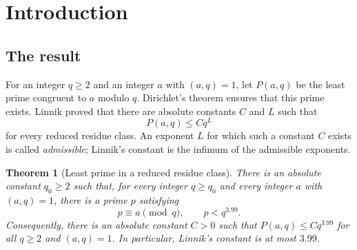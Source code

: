 \documentclass[11pt]{amsart}
\numberwithin{equation}{section}
\theoremstyle{plain}
\newtheorem{theorem}{Theorem}[section]
\theoremstyle{definition}
\theoremstyle{remark}
\newcommand{\1}{\mathbf{1}}
\begin{document}
\begin{center}
\end{center}

\clearpage
\setcounter{tocdepth}{1}
\begingroup
\small
\tableofcontents
\endgroup

\section{Introduction}\label{sec:intro}

\subsection{The result}
For an integer $q\ge2$ and an integer $a$ with $(a,q)=1$, let $P(a,q)$ be the least prime
congruent to $a$ modulo $q$. Dirichlet's theorem \cite{Dirichlet1889beweis} ensures that this
prime exists. Linnik \cite{Linnik1944least,Linnik1944deuring} proved that there are absolute
constants $C$ and $L$ such that
\begin{equation}\label{eq:linnik}
  P(a,q)\le Cq^L
\end{equation}
for every reduced residue class. An exponent $L$ for which such a constant $C$ exists is
called \emph{admissible}; Linnik's constant is the infimum of the admissible exponents.

\begin{theorem}[Least prime in a reduced residue class]\label{thm:main}
There is an absolute constant $q_0\ge2$ such that, for every integer $q\ge q_0$ and every
integer $a$ with $(a,q)=1$, there is a prime $p$ satisfying
\[
  p\equiv a\pmod q,\qquad p<q^{3.99}.
\]
Consequently, there is an absolute constant $C>0$ such that
$P(a,q)\le Cq^{3.99}$ for all $q\ge2$ and $(a,q)=1$. In particular, Linnik's constant is at
most $3.99$.
\end{theorem}
\end{document}
